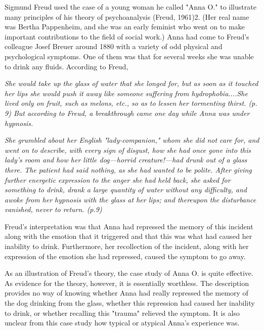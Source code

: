 \color{fgcolor}\begin{kframe}

Sigmund Freud used the case of a young woman he called "Anna O." to illustrate many principles of his theory of psychoanalysis (Freud, 1961)2. (Her real name was Bertha Pappenheim, and she was an early feminist who went on to make important contributions to the field of social work.) Anna had come to Freud's colleague Josef Breuer around 1880 with a variety of odd physical and psychological symptoms. One of them was that for several weeks she was unable to drink any fluids. According to Freud,

\emph{She would take up the glass of water that she longed for, but as soon as it touched her lips she would push it away like someone suffering from hydrophobia....She lived only on fruit, such as melons, etc., so as to lessen her tormenting thirst. (p. 9)
But according to Freud, a breakthrough came one day while Anna was under hypnosis.}

\emph{She grumbled about her English "lady-companion," whom she did not care for, and went on to describe, with every sign of disgust, how she had once gone into this lady's room and how her little dog---horrid creature!---had drunk out of a glass there. The patient had said nothing, as she had wanted to be polite. After giving further energetic expression to the anger she had held back, she asked for something to drink, drank a large quantity of water without any difficulty, and awoke from her hypnosis
with the glass at her lips; and thereupon the disturbance vanished, never to return. (p.9)}

Freud's interpretation was that Anna had repressed the memory of this incident along with the emotion that it triggered and that this was what had caused her inability to drink. Furthermore, her recollection of the
incident, along with her expression of the emotion she had repressed, caused the symptom to go away.

As an illustration of Freud's theory, the case study of Anna O. is quite effective. As evidence for the theory, however, it is essentially worthless. The description provides no way of knowing whether Anna had really repressed the memory of the dog drinking from the glass, whether this repression had caused her inability to drink, or whether recalling this "trauma" relieved the symptom. It is also unclear from this case
study how typical or atypical Anna's experience was.
\end{kframe}

